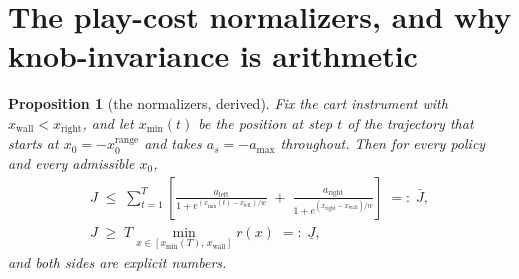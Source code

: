 \documentclass[11pt]{article}
\newtheorem{proposition}{Proposition}
\theoremstyle{definition}
\theoremstyle{remark}
\begin{document}
\section{The play-cost normalizers, and why knob-invariance is arithmetic}
\label{sup:normalizers}

\begin{proposition}[the normalizers, derived]
\label{prop:normalizers}
Fix the cart instrument with $x_\mathrm{wall} < x_\mathrm{right}$, and let $x_{\min}(t)$ be the position at step $t$ of the trajectory that starts at $x_0 = -x_0^{\mathrm{range}}$ and takes $a_s = -a_{\max}$ throughout. Then for \emph{every} policy and every admissible $x_0$,
\[
\begin{gathered}
  J \;\leq\; \sum_{t=1}^{T}\left[\frac{a_\mathrm{left}}{1 + e^{(x_{\min}(t) - x_\mathrm{left})/w}} \;+\; \frac{a_\mathrm{right}}{1 + e^{(x_\mathrm{right} - x_\mathrm{wall})/w}}\right]
  \;=:\; \bar J, \\[2pt]
  J \;\geq\; T \min_{x \in [x_{\min}(T),\, x_\mathrm{wall}]} r(x) \;=:\; \underline J,
\end{gathered}
\]
and both sides are explicit numbers.
\end{proposition}
\end{document}

